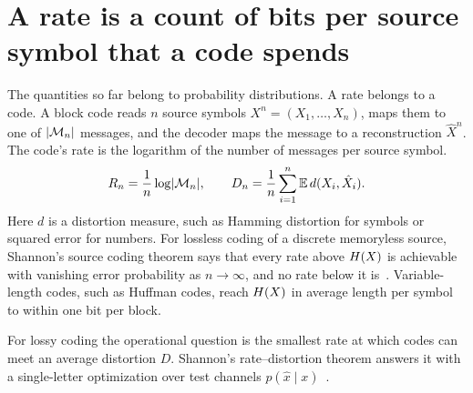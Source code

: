 
\section{A rate is a count of bits per source symbol that a code spends}\label{sec:ch03:rate}

The quantities so far belong to probability distributions. A rate belongs to a code. A block code reads $n$ source symbols $X^n=(X_1,\dots,X_n)$, maps them to one of $\lvert \mathcal M_n\rvert$ messages, and the decoder maps the message to a reconstruction $\hat X^n$. The code's rate is the logarithm of the number of messages per source symbol.
\begin{equation}\label{eq:ch03:rate}
R_n=\frac1n\log\lvert \mathcal M_n\rvert,\qquad
D_n=\frac1n\sum_{i=1}^n\mathbb{E}\,d(X_i,\hat X_i).
\end{equation}
Here $d$ is a distortion measure, such as Hamming distortion for symbols or squared error for numbers. For lossless coding of a discrete memoryless source, Shannon's source coding theorem says that every rate above $H(X)$ is achievable with vanishing error probability as $n\to\infty$, and no rate below it is~\cite{coverthomas2006}. Variable-length codes, such as Huffman codes, reach $H(X)$ in average length per symbol to within one bit per block.

For lossy coding the operational question is the smallest rate at which codes can meet an average distortion $D$. Shannon's rate--distortion theorem answers it with a single-letter optimization over test channels $p(\hat x\mid x)$~\cite{coverthomas2006,berger1971}.


